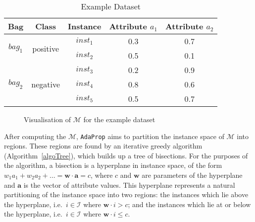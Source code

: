 \documentclass[a4paper,12pt]{article} %
\newcommand{\AdaProp}{\texttt{AdaProp}\xspace}
\newcommand{\mcl}[1]{\mathcal{#1}}
\newcommand{\vect}[1]{\boldsymbol{#1}}
\begin{document}
\begin{table}
\begin{center}
\begin{tabular}{ccccc}
    \toprule
    Bag & Class & Instance & Attribute $a_1$ & Attribute $a_2$ \\
    \midrule
    \multirow{2}{*}{$bag_1$} & \multirow{2}{*}{positive} & $inst_1$ & 0.3 & 0.7 \\
    &  & $inst_2$ & 0.5 & 0.1 \\
    \cmidrule(r){1-5}
    \multirow{3}{*}{$bag_2$} & \multirow{3}{*}{negative} & $inst_3$ & 0.2 & 0.9 \\
    & & $inst_4$ & 0.8 & 0.6 \\
    & & $inst_5$ & 0.5 & 0.7 \\
    \bottomrule
    
\end{tabular}
\end{center}
\caption{Example Dataset}
\label{tEgData}
\end{table}

\begin{figure}
\begin{center}
\end{center}
\caption{Visualisation of $\mcl{M}$ for the example dataset}
\label{visM}
\end{figure}

After computing the $\mcl{M}$, 
    \AdaProp aims to partition the instance space of $\mcl{M}$ into regions.
These regions are found by an iterative greedy algorithm (Algorithm~\ref{algoTree}), 
    which builds up a tree of bisections.
For the purposes of the algorithm, 
    a bisection is a hyperplane in instance space, 
    of the form $w_1a_1 + w_2a_2 + \ldots = \vect{w} \cdot \vect{a} = c$,
    where $c$ and $\vect{w}$ are parameters of the hyperplane and 
    $\vect{a}$ is the vector of attribute values.
This hyperplane represents a natural partitioning of the instance space
    into two regions:
        the instances which lie above the hyperplane, 
            i.e.\ $i \in \mcl{I}$ where $\vect{w} \cdot{i} > c$; and
        the instances which lie at or below the hyperplane,
            i.e.\ $i \in \mcl{I}$ where $\vect{w} \cdot{i} \leq c$.
    
\end{document}
